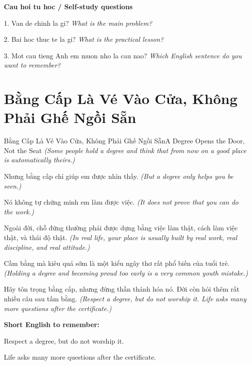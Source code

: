 \begin{tuhocnhanh}
\textbf{Cau hoi tu hoc / Self-study questions}

1. Van de chinh la gi? \textit{What is the main problem?}

2. Bai hoc thuc te la gi? \textit{What is the practical lesson?}

3. Mot cau tieng Anh em muon nho la cau nao? \textit{Which English sentence do you want to remember?}
\end{tuhocnhanh}
\ngancach

\section{Bằng Cấp Là Vé Vào Cửa, Không Phải Ghế Ngồi Sẵn}
\begin{truyen}{Bằng Cấp Là Vé Vào Cửa, Không Phải Ghế Ngồi Sẵn}{A Degree Opens the Door, Not the Seat}
\textit{(Some people hold a degree and think that from now on a good place is automatically theirs.)}

Nhưng bằng cấp chỉ giúp em được nhìn thấy.
\textit{(But a degree only helps you be seen.)}

Nó không tự chứng minh em làm được việc.
\textit{(It does not prove that you can do the work.)}

Ngoài đời, chỗ đứng thường phải được dựng bằng việc làm thật, cách làm việc thật, và thái độ thật.
\textit{(In real life, your place is usually built by real work, real discipline, and real attitude.)}

Cầm bằng mà kiêu quá sớm là một kiểu ngây thơ rất phổ biến của tuổi trẻ.
\textit{(Holding a degree and becoming proud too early is a very common youth mistake.)}

\end{truyen}

\begin{baihoc}
Hãy tôn trọng bằng cấp, nhưng đừng thần thánh hóa nó. Đời còn hỏi thêm rất nhiều câu sau tấm bằng.
\textit{(Respect a degree, but do not worship it. Life asks many more questions after the certificate.)}
\end{baihoc}

\begin{ghinhoanh}
\textbf{Short English to remember:}

Respect a degree, but do not worship it.

Life asks many more questions after the certificate.

\end{ghinhoanh}

